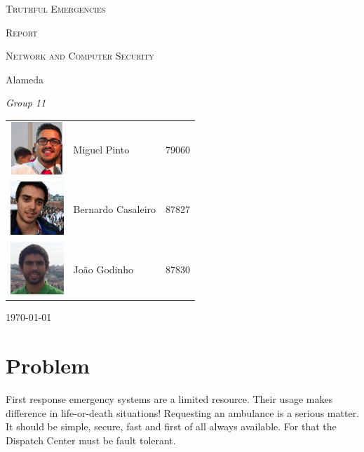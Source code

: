 \documentclass[a4paper,titlepage,11pt]{article}
\begin{document}
\begin{titlepage}
  \begin{center}
    {\scshape \huge Truthful Emergencies \par}
    \vspace{1cm}

    {\scshape \LARGE Report \par}
    \vspace{1.5cm}

    {\scshape \Large Network and Computer Security \par}
    \vspace{0.5cm}

    {\Large Alameda \par}
    \vfill

    {\itshape \Large Group 11 \par}
    \vfill

    \begin{tabular}{l l l}
      \includegraphics[width=20mm, height=20mm]{img/miguel.png} & Miguel Pinto & 79060\\
      \includegraphics[width=20mm, height=20mm]{img/bernardo.jpeg} & Bernardo Casaleiro & 87827\\
      \includegraphics[width=20mm, height=20mm]{img/joao.jpeg} & João Godinho & 87830\\
    \end{tabular}
    \vfill

    {\large \today\par}
  \end{center}
\end{titlepage}

\section{Problem}
First response emergency systems are a limited resource. Their usage makes difference in life-or-death situations!
Requesting an ambulance is a serious matter.
It should be simple, secure, fast and first of all always available.
For that the Dispatch Center must be fault tolerant.
\end{document}
